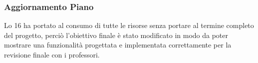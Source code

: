 \subsubsection{Aggiornamento Piano}
\label{sec:aggiornamento_piano_sprint16}
Lo  16 ha portato al consumo di tutte le risorse senza portare al termine completo del progetto, perciò l'obiettivo finale è stato modificato in modo da poter mostrare 
una funzionalità progettata e implementata correttamente per la revisione finale con i professori. 